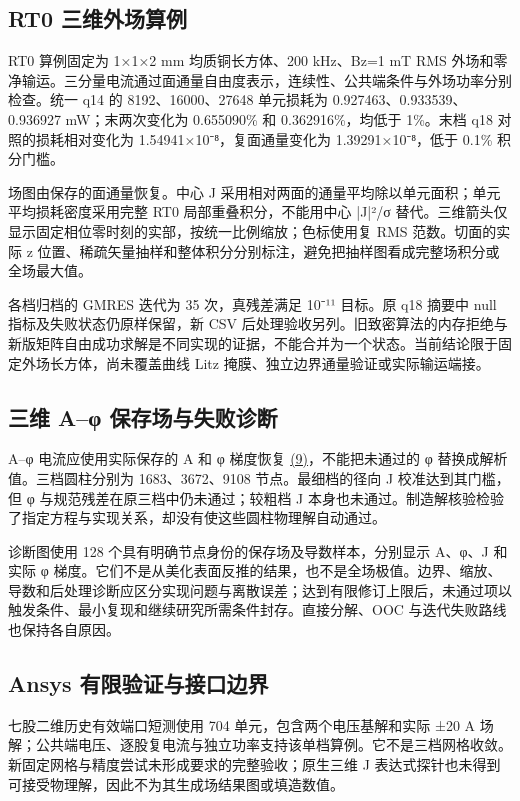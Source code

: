 \documentclass[journal,10pt]{IEEEtran}
\begin{document}
\subsection*{RT0 三维外场算例}
\hypertarget{S2.rt0.heading}{}
RT0 算例固定为 1×1×2 mm 均质铜长方体、200 kHz、Bz=1 mT RMS 外场和零净输运。三分量电流通过面通量自由度表示，连续性、公共端条件与外场功率分别检查。统一 q14 的 8192、16000、27648 单元损耗为 0.927463、0.933539、0.936927 mW；末两次变化为 0.655090\% 和 0.362916\%，均低于 1\%。末档 q18 对照的损耗相对变化为 1.54941×10⁻⁸，复面通量变化为 1.39291×10⁻⁸，低于 0.1\% 积分门槛。


场图由保存的面通量恢复。中心 J 采用相对两面的通量平均除以单元面积；单元平均损耗密度采用完整 RT0 局部重叠积分，不能用中心 |J|²/σ 替代。三维箭头仅显示固定相位零时刻的实部，按统一比例缩放；色标使用复 RMS 范数。切面的实际 z 位置、稀疏矢量抽样和整体积分分别标注，避免把抽样图看成完整场积分或全场最大值。


各档归档的 GMRES 迭代为 35 次，真残差满足 10⁻¹¹ 目标。原 q18 摘要中 null 指标及失败状态仍原样保留，新 CSV 后处理验收另列。旧致密算法的内存拒绝与新版矩阵自由成功求解是不同实现的证据，不能合并为一个状态。当前结论限于固定外场长方体，尚未覆盖曲线 Litz 掩膜、独立边界通量验证或实际输运端接。


\subsection*{三维 A–φ 保存场与失败诊断}
\hypertarget{S2.aphi.heading}{}
A–φ 电流应使用实际保存的 A 和 φ 梯度恢复 \href{paper_zh-CN_ieee.pdf#E07}{(9)}，不能把未通过的 φ 替换成解析值。三档圆柱分别为 1683、3672、9108 节点。最细档的径向 J 校准达到其门槛，但 φ 与规范残差在原三档中仍未通过；较粗档 J 本身也未通过。制造解核验检验了指定方程与实现关系，却没有使这些圆柱物理解自动通过。


诊断图使用 128 个具有明确节点身份的保存场及导数样本，分别显示 A、φ、J 和实际 φ 梯度。它们不是从美化表面反推的结果，也不是全场极值。边界、缩放、导数和后处理诊断应区分实现问题与离散误差；达到有限修订上限后，未通过项以触发条件、最小复现和继续研究所需条件封存。直接分解、OOC 与迭代失败路线也保持各自原因。


\subsection*{Ansys 有限验证与接口边界}
\hypertarget{S2.ansys.heading}{}
七股二维历史有效端口短测使用 704 单元，包含两个电压基解和实际 ±20 A 场解；公共端电压、逐股复电流与独立功率支持该单档算例。它不是三档网格收敛。新固定网格与精度尝试未形成要求的完整验收；原生三维 J 表达式探针也未得到可接受物理解，因此不为其生成场结果图或填造数值。
\end{document}
